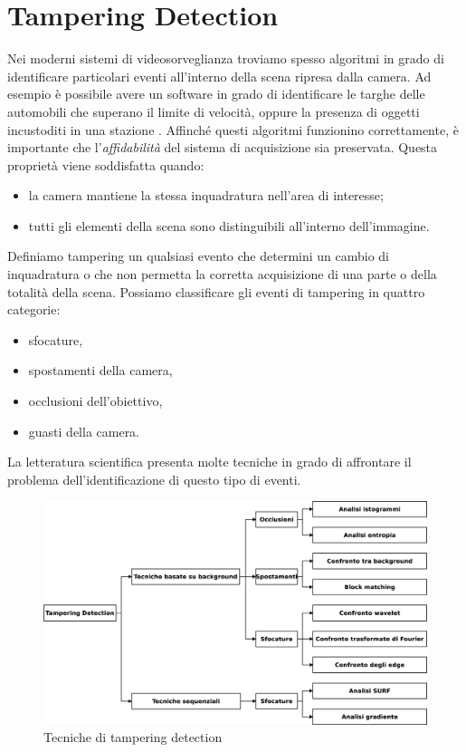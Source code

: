 \section{Tampering Detection}
\label{tamperingSOA}
Nei moderni sistemi di videosorveglianza troviamo spesso algoritmi in grado di identificare particolari eventi all'interno della scena ripresa dalla camera. 
Ad esempio \`e possibile avere un software in grado di identificare le targhe delle automobili che superano il limite di velocit\`a, oppure la presenza di oggetti incustoditi in una stazione \cite{Targhe}.
Affinch\'e questi algoritmi funzionino correttamente, \`e importante che l'\textit{affidabilit\`a} del sistema di acquisizione sia preservata.
Questa propriet\`a viene soddisfatta quando:
\begin{itemize}
	\item la camera mantiene la stessa inquadratura nell'area di interesse;
	\item tutti gli elementi della scena sono distinguibili all'interno dell'immagine.
\end{itemize}
Definiamo \gls{tampering} un qualsiasi evento che determini un cambio di inquadratura o che non permetta la corretta acquisizione di una parte o della totalit\`a della scena.
Possiamo classificare gli eventi di tampering in quattro categorie:
\begin{itemize}
	\item sfocature,
	\item spostamenti della camera,
	\item occlusioni dell'obiettivo,
	\item guasti della camera.
\end{itemize}
La letteratura scientifica presenta molte tecniche in grado di affrontare il problema dell'identificazione di questo tipo di eventi.
\begin{figure}[tb]
	\centering
	\includegraphics[width=12cm]{./diagrammi/tecnicheSOA.eps}
	\caption{Tecniche di tampering detection}
	\label{fig:tamperingSOA}
\end{figure}
